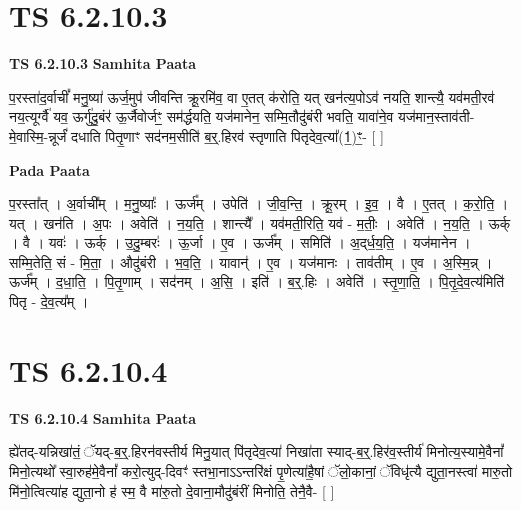 \documentclass[17pt]{extarticle}
\begin{document}
\section*{ TS 6.2.10.3 }

\textbf{TS 6.2.10.3 } \newline
\textbf{Samhita Paata} \newline

प॒रस्ता॑द॒र्वाचीं᳚ मनु॒ष्या॑ ऊर्ज॒मुप॑ जीवन्ति क्रू॒रमि॑व॒ वा ए॒तत् क॑रोति॒ यत् खन॑त्य॒पोऽव॑ नयति॒ शान्त्यै॒ यव॑मती॒रव॑ नय॒त्यूर्ग्वै॑ यव॒ ऊर्गु॑दु॒बंर॑ ऊ॒र्जैवोर्जꣳ॒॒ सम॑र्द्धयति॒ यज॑मानेन॒ सम्मि॒तौदु॑बंरी भवति॒ यावा॑ने॒व यज॑मान॒स्ताव॑ती-मे॒वास्मि॒-न्नूर्जं॑ दधाति पितृ॒णाꣳ सद॑नम॒सीति॑ ब॒र्॒.हिरव॑ स्तृणाति पितृदेव॒त्या᳚(1॒)ꣳ॒- [  ] \newline

\textbf{Pada Paata} \newline

प॒रस्ता᳚त् । अ॒र्वाची᳚म् । म॒नु॒ष्याः᳚ । ऊर्ज᳚म् । उपेति॑ । जी॒व॒न्ति॒ । क्रू॒रम् । इ॒व॒ । वै । ए॒तत् । क॒रो॒ति॒ । यत् । खन॑ति । अ॒पः । अवेति॑ । न॒य॒ति॒ । शान्त्यै᳚ । यव॑मती॒रिति॒ यव॑ - म॒तीः॒ । अवेति॑ । न॒य॒ति॒ । ऊर्क् । वै । यवः॑ । ऊर्क् । उ॒दु॒म्बरः॑ । ऊ॒र्जा । ए॒व । ऊर्ज᳚म् । समिति॑ । अ॒द्‌र्ध॒य॒ति॒ । यज॑मानेन । सम्मि॒तेति॒ सं - मि॒ता॒ । औदु॑बंरी । भ॒व॒ति॒ । यावान्॑ । ए॒व । यज॑मानः । ताव॑तीम् । ए॒व । अ॒स्मि॒न्न् । ऊर्ज᳚म् । द॒धा॒ति॒ । पि॒तृ॒णाम् । सद॑नम् । अ॒सि॒ । इति॑ । ब॒र्॒.हिः । अवेति॑ । स्तृ॒णा॒ति॒ । पि॒तृ॒दे॒व॒त्य॑मिति॑ पितृ - दे॒व॒त्य᳚म् ।  \newline




\section*{ TS 6.2.10.4 }

\textbf{TS 6.2.10.4 } \newline
\textbf{Samhita Paata} \newline

ह्ये॑तद्-यन्निखा॑तं॒ ॅयद्-ब॒र्॒.हिरन॑वस्तीर्य मिनु॒यात् पि॑तृदेव॒त्या॑ निखा॑ता स्याद्-ब॒र्॒.हिर॑व॒स्तीर्य॑ मिनोत्य॒स्यामे॒वैनां᳚ मिनो॒त्यथो᳚ स्वा॒रुह॑मे॒वैनां᳚ करो॒त्युद्-दिवꣳ॑ स्तभा॒नाऽऽन्तरि॑क्षं पृ॒णेत्या॑है॒षां ॅलो॒कानां॒ ॅविधृ॑त्यै द्युता॒नस्त्वा॑ मारु॒तो मि॑नो॒त्वित्या॑ह द्युता॒नो ह॑ स्म॒ वै मा॑रु॒तो दे॒वाना॒मौदु॑बंरीं मिनोति॒ तेनै॒वै- [  ] \newline
\end{document}
